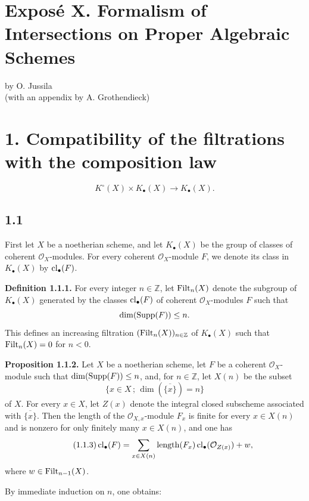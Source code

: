 
\section*{Expos\'e X. Formalism of Intersections on Proper Algebraic Schemes}
\begin{center}
by O. Jussila\\
(with an appendix by A. Grothendieck)
\end{center}

\section*{1. Compatibility of the filtrations with the composition law}
\[
K^\circ(X)\times K_\bullet(X)\longrightarrow K_\bullet(X).
\]

\subsection*{1.1}
First let $X$ be a noetherian scheme, and let $K_\bullet(X)$ be the group of
classes of coherent $\mathcal O_X$-modules. For every coherent
$\mathcal O_X$-module $F$, we denote its class in $K_\bullet(X)$ by
$\operatorname{cl}_\bullet(F)$.

\textbf{Definition 1.1.1.}
For every integer $n\in\mathbb Z$, let $\operatorname{Filt}_n(X)$ denote the subgroup of
$K_\bullet(X)$ generated by the classes $\operatorname{cl}_\bullet(F)$ of coherent
$\mathcal O_X$-modules $F$ such that
\[
\dim(\operatorname{Supp}(F))\leq n.
\]
This defines an increasing filtration $(\operatorname{Filt}_n(X))_{n\in\mathbb Z}$ of
$K_\bullet(X)$ such that $\operatorname{Filt}_n(X)=0$ for $n<0$.

\textbf{Proposition 1.1.2.}
Let $X$ be a noetherian scheme, let $F$ be a coherent $\mathcal O_X$-module
such that $\dim(\operatorname{Supp}(F))\leq n$, and, for $n\in\mathbb Z$, let $X(n)$ be the
subset
\[
\{x\in X\,;\,\dim(\overline{\{x\}})=n\}
\]
of $X$. For every $x\in X$, let $Z(x)$ denote the integral closed subscheme
associated with $\overline{\{x\}}$. Then the length of the
$\mathcal O_{X,x}$-module $F_x$ is finite for every $x\in X(n)$ and is
nonzero for only finitely many $x\in X(n)$, and one has
\begin{equation}\tag{1.1.3}
\operatorname{cl}_\bullet(F)=
\sum_{x\in X(n)}\operatorname{length}(F_x)\operatorname{cl}_\bullet(\mathcal O_{Z(x)})+w,
\end{equation}
where $w\in\operatorname{Filt}_{n-1}(X)$.

By immediate induction on $n$, one obtains:

